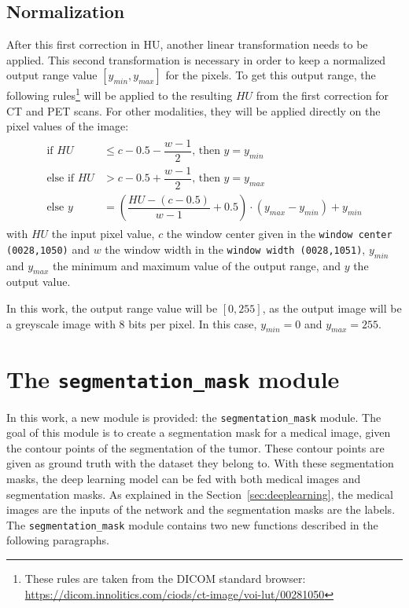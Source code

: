 \subsection{Normalization}
After this first correction in HU, another linear transformation needs to be applied. This second transformation is necessary in order to keep a normalized output range value $[y_{min},y_{max}]$ for the pixels. To get this output range, the following rules\footnote{These rules are taken from the DICOM standard browser: \\ \url{https://dicom.innolitics.com/ciods/ct-image/voi-lut/00281050}} will be applied to the resulting $HU$ from the first correction for CT and PET scans. For other modalities, they will be applied directly on the pixel values of the image:
\begin{align}
  \begin{split}
    \text{if } HU &\leq c - 0.5 - \dfrac{w - 1}{2} \text{, then } y = y_{min} \\
    \text{else if } HU &> c - 0.5 + \dfrac{w - 1}{2} \text{, then } y = y_{max} \\
    \text{else } y &= \left( \dfrac{HU - (c - 0.5)}{w - 1} + 0.5 \right) \cdot (y_{max} - y_{min}) + y_{min}
  \end{split}
\end{align}
with $HU$ the input pixel value, $c$ the window center given in the \texttt{window center (0028,1050)} and $w$ the window width in the \texttt{window width (0028,1051)}, $y_{min}$ and $y_{max}$ the minimum and maximum value of the output range, and $y$ the output value.

In this work, the output range value will be $[0,255]$, as the output image will be a greyscale image with 8 bits per pixel. In this case, $y_{min} = 0$ and $y_{max} = 255$.


\section{The \texttt{segmentation\_mask} module}
\label{sec:segmaskmodule}
In this work, a new module is provided: the \texttt{segmentation\_mask} module. The goal of this module is to create a segmentation mask for a medical image, given the contour points of the segmentation of the tumor. These contour points are given as ground truth with the dataset they belong to. With these segmentation masks, the deep learning model can be fed with both medical images and segmentation masks. As explained in the Section~\ref{sec:deeplearning}, the medical images are the inputs of the network and the segmentation masks are the labels. The \texttt{segmentation\_mask} module contains two new functions described in the following paragraphs.

